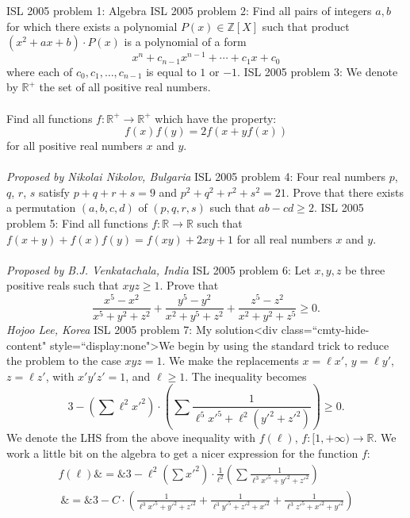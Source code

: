 ISL 2005 problem 1:  Algebra 
ISL 2005 problem 2:  Find all pairs of integers $a,b$ for which there exists a polynomial $P(x) \in \mathbb{Z}[X]$ such that product $(x^2+ax+b)\cdot P(x)$ is a polynomial of a form
\[ x^n+c_{n-1}x^{n-1}+\cdots+c_1x+c_0 \]
where each of $c_0,c_1,\ldots,c_{n-1}$ is equal to $1$ or $-1$. 
ISL 2005 problem 3:  We denote by $\mathbb{R}^+$ the set of all positive real numbers. \\\\
Find all functions $f: \mathbb R^ + \rightarrow\mathbb R^ +$ which have the property:
\[ f(x)f(y)=2f(x+yf(x)) \]
for all positive real numbers $x$ and $y$. \\\\
\textit{Proposed by Nikolai Nikolov, Bulgaria} 
ISL 2005 problem 4:  Four real numbers $ p$, $ q$, $ r$, $ s$ satisfy $ p+q+r+s = 9$ and $ p^2+q^2+r^2+s^2= 21$. Prove that there exists a permutation $ \left(a,b,c,d\right)$ of $ \left(p,q,r,s\right)$ such that $ ab-cd \geq 2$. 
ISL 2005 problem 5:  Find all functions $ f: \mathbb{R}\to\mathbb{R}$ such that $ f(x+y)+f(x)f(y)=f(xy)+2xy+1$ for all real numbers $ x$ and $ y$. \\\\
\textit{Proposed by B.J. Venkatachala, India} 
ISL 2005 problem 6:  Let $x,y,z$ be three positive reals such that $xyz\geq 1$. Prove that
\[
\frac { x^5-x^2 }{x^5+y^2+z^2} + \frac {y^5-y^2}{x^2+y^5+z^2} + \frac {z^5-z^2}{x^2+y^2+z^5} \geq 0 .
\]
\textit{Hojoo Lee, Korea} 
ISL 2005 problem 7:  My solution<div class=``cmty-hide-content" style=``display:none">We begin by using the standard trick to reduce the problem to the case $xyz=1$. We make the replacements $x=\ell x'$, $y=\ell y'$, $z=\ell z'$, with $x'y'z'=1$, and $\ell \geq 1$. The inequality becomes
\[
3 - \left( \sum { \ell^2 x'^2 } \right) \cdot \left ( \sum \frac 1 { \ell^5 x'^5 + \ell^2 ( y'^2+z'^2 ) } \right) \geq 0 .
\]
We denote the LHS from the above inequality with $f(\ell)$, $f:[1,+\infty) \to \mathbb{R}$. We work a little bit on the algebra to get a nicer expression for the function $f$:
\begin{eqnarray*}
 f(\ell ) \&=\& 3 - \ell^2 \left( \sum x'^2 \right) \cdot \frac 1{\ell^2 } \left ( \sum \frac 1 { \ell^3 x'^5 + y'^2 + z'^2 } \right) \\
 \ \&=\& 3 - C \cdot \left (  \frac 1 { \ell^3 x'^5 + y'^2 + z'^2 } +  \frac 1 { \ell^3 y'^5 + z'^2 + x'^2 } +  \frac 1 { \ell^3 z'^5 + x'^2 + y'^2 } \right) \\
\end{eqnarray*}
